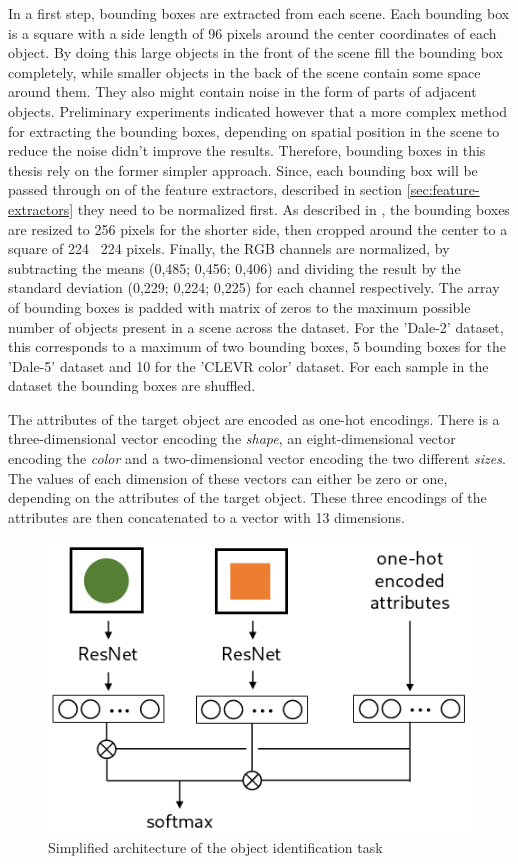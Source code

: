 In a first step, bounding boxes are extracted from each scene.
Each bounding box is a square with a side length of 96 pixels around the center coordinates of each object.
By doing this large objects in the front of the scene fill the bounding box completely, while smaller objects in the back of the scene contain some space around them.
They also might contain noise in the form of parts of adjacent objects.
Preliminary experiments indicated however that a more complex method for extracting the bounding boxes, depending on spatial position in the scene to reduce the noise didn't improve the results.
Therefore, bounding boxes in this thesis rely on the former simpler approach.
Since, each bounding box will be passed through on of the feature extractors, described in section \ref{sec:feature-extractors} they need to be normalized first.
As described in \citep{He2016,Simonyan2015}, the bounding boxes are resized to 256 pixels for the shorter side, then cropped around the center to a square of 224 \times\ 224 pixels.
Finally, the RGB channels are normalized, by subtracting the means (0,485; 0,456; 0,406) and dividing the result by the standard deviation (0,229; 0,224; 0,225) for each channel respectively.
The array of bounding boxes is padded with matrix of zeros to the maximum possible number of objects present in a scene across the dataset.
For the 'Dale-2' dataset, this corresponds to a maximum of two bounding boxes, 5 bounding boxes for the 'Dale-5' dataset and 10 for the 'CLEVR color' dataset.
For each sample in the dataset the bounding boxes are shuffled.

The attributes of the target object are encoded as one-hot encodings.
There is a three-dimensional vector encoding the \emph{shape}, an eight-dimensional vector encoding the \emph{color} and a two-dimensional vector encoding the two different \emph{sizes}.
The values of each dimension of these vectors can either be zero or one, depending on the attributes of the target object.
These three encodings of the attributes are then concatenated to a vector with 13 dimensions.

\begin{figure}[ht]
    \centering
    \includegraphics[width=.5\linewidth]{figures/arch_bounding_box_classifier.png}
    \caption{Simplified architecture of the object identification task}
    \label{fig:bounding_box_classifier_architecture}
\end{figure}

